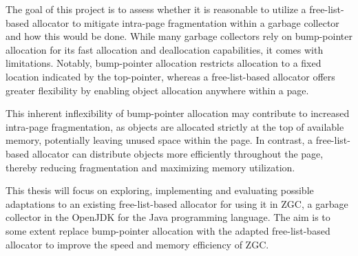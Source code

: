 
The goal of this project is to assess whether it is reasonable to utilize a free-list-based allocator to mitigate intra-page fragmentation within a garbage collector and how this would be done. While many garbage collectors rely on bump-pointer allocation for its fast allocation and deallocation capabilities, it comes with limitations. Notably, bump-pointer allocation restricts allocation to a fixed location indicated by the top-pointer, whereas a free-list-based allocator offers greater flexibility by enabling object allocation anywhere within a page.

This inherent inflexibility of bump-pointer allocation may contribute to increased intra-page fragmentation, as objects are allocated strictly at the top of available memory, potentially leaving unused space within the page. In contrast, a free-list-based allocator can distribute objects more efficiently throughout the page, thereby reducing fragmentation and maximizing memory utilization.

This thesis will focus on exploring, implementing and evaluating possible adaptations to an existing free-list-based allocator for using it in ZGC, a garbage collector in the OpenJDK for the Java programming language. The aim is to some extent replace bump-pointer allocation with the adapted free-list-based allocator to improve the speed and memory efficiency of ZGC.

